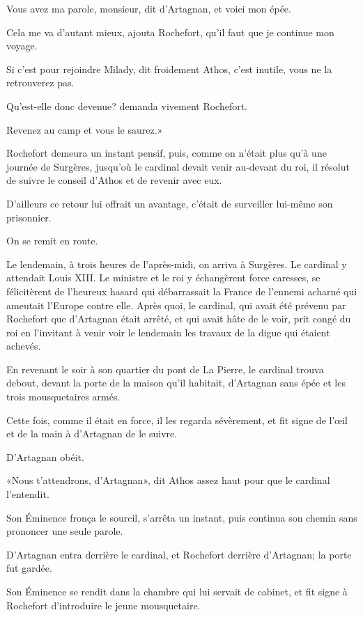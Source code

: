 \speak  Vous avez ma parole, monsieur, dit d'Artagnan, et voici mon épée. 

\speak  Cela me va d'autant mieux, ajouta Rochefort, qu'il faut que je continue mon voyage. 

\speak  Si c'est pour rejoindre Milady, dit froidement Athos, c'est inutile, vous ne la retrouverez pas. 

\speak  Qu'est-elle donc devenue? demanda vivement Rochefort. 

\speak  Revenez au camp et vous le saurez.» 

Rochefort demeura un instant pensif, puis, comme on n'était plus qu'à une journée de Surgères, jusqu'où le cardinal devait venir au-devant du roi, il résolut de suivre le conseil d'Athos et de revenir avec eux. 

D'ailleurs ce retour lui offrait un avantage, c'était de surveiller lui-même son prisonnier. 

On se remit en route. 

Le lendemain, à trois heures de l'après-midi, on arriva à Surgères. Le cardinal y attendait Louis XIII. Le ministre et le roi y échangèrent force caresses, se félicitèrent de l'heureux hasard qui débarrassait la France de l'ennemi acharné qui ameutait l'Europe contre elle. Après quoi, le cardinal, qui avait été prévenu par Rochefort que d'Artagnan était arrêté, et qui avait hâte de le voir, prit congé du roi en l'invitant à venir voir le lendemain les travaux de la digue qui étaient achevés. 

En revenant le soir à son quartier du pont de La Pierre, le cardinal trouva debout, devant la porte de la maison qu'il habitait, d'Artagnan sans épée et les trois mousquetaires armés. 

Cette fois, comme il était en force, il les regarda sévèrement, et fit signe de l'œil et de la main à d'Artagnan de le suivre. 

D'Artagnan obéit. 

«Nous t'attendrons, d'Artagnan», dit Athos assez haut pour que le cardinal l'entendit. 

Son Éminence fronça le sourcil, s'arrêta un instant, puis continua son chemin sans prononcer une seule parole. 

D'Artagnan entra derrière le cardinal, et Rochefort derrière d'Artagnan; la porte fut gardée. 

Son Éminence se rendit dans la chambre qui lui servait de cabinet, et fit signe à Rochefort d'introduire le jeune mousquetaire. 

